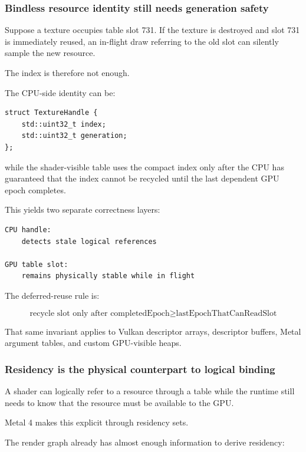 \subsubsection{Bindless resource identity still needs generation safety}\label{05-engine-i-ch022-bindless-resource-identity-still-needs-generation-safety}

Suppose a texture occupies table slot 731. If the texture is destroyed and slot 731 is immediately reused, an in-flight draw referring to the old slot can silently sample the new resource.

The index is therefore not enough.

The CPU-side identity can be:

\begin{verbatim}
struct TextureHandle {
    std::uint32_t index;
    std::uint32_t generation;
};
\end{verbatim}

while the shader-visible table uses the compact index only after the CPU has guaranteed that the index cannot be recycled until the last dependent GPU epoch completes.

This yields two separate correctness layers:

\begin{verbatim}
CPU handle:
    detects stale logical references

GPU table slot:
    remains physically stable while in flight
\end{verbatim}

The deferred-reuse rule is:

\[
\boxed{
\text{recycle slot only after completedEpoch}
\ge
\text{lastEpochThatCanReadSlot}
}
\]

That same invariant applies to Vulkan descriptor arrays, descriptor buffers, Metal argument tables, and custom GPU-visible heaps.

\subsubsection{Residency is the physical counterpart to logical binding}\label{05-engine-i-ch022-residency-is-the-physical-counterpart-to-logical-binding}

A shader can logically refer to a resource through a table while the runtime still needs to know that the resource must be available to the GPU.

Metal 4 makes this explicit through residency sets.

The render graph already has almost enough information to derive residency:


